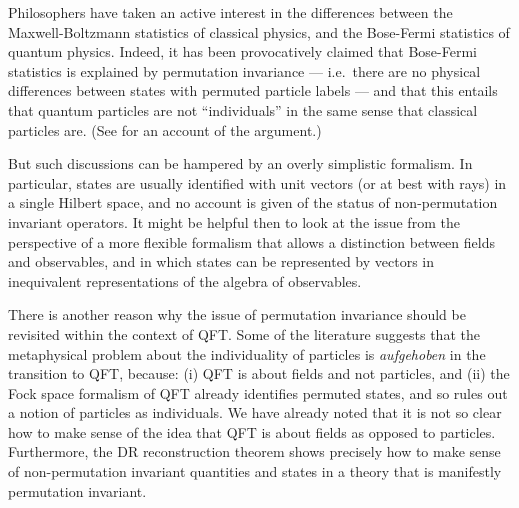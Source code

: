 \documentclass[12pt]{article}
\theoremstyle{definition}
\theoremstyle{definition}
\theoremstyle{remark}
\begin{document}
Philosophers have taken an active interest in the differences between
the Maxwell-Boltzmann statistics of classical physics, and the
Bose-Fermi statistics of quantum physics.  Indeed, it has been
provocatively claimed that Bose-Fermi statistics is explained by
permutation invariance --- i.e.\ there are no physical differences
between states with permuted particle labels --- and that this entails
that quantum particles are not ``individuals'' in the same sense that
classical particles are.  (See \cite{french2,french} for an account of
the argument.)

But such discussions can be hampered by an overly simplistic
formalism.  In particular, states are usually identified with unit
vectors (or at best with rays) in a single Hilbert space, and no
account is given of the status of non-permutation invariant operators.
It might be helpful then to look at the issue from the perspective of
a more flexible formalism that allows a distinction between fields and
observables, and in which states can be represented by vectors in
inequivalent representations of the algebra of observables.

There is another reason why the issue of permutation invariance should
be revisited within the context of QFT.  Some of the literature
suggests that the metaphysical problem about the individuality of
particles is \emph{aufgehoben} in the transition to QFT, because: (i)
QFT is about fields and not particles, and (ii) the Fock space
formalism of QFT already identifies permuted states, and so rules out
a notion of particles as individuals.  We have already noted that it
is not so clear how to make sense of the idea that QFT is about fields
as opposed to particles.  Furthermore, the DR reconstruction theorem
shows precisely how to make sense of non-permutation invariant
quantities and states in a theory that is manifestly permutation
invariant.
\end{document}
